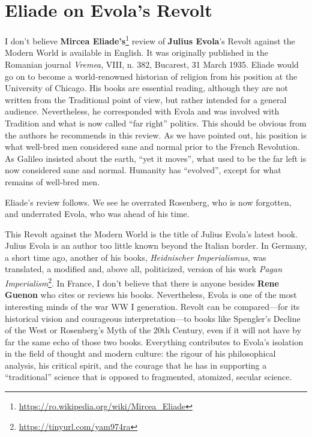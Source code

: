\section{Eliade on Evola’s Revolt}

\begin{quotex}
I don't believe \textbf{Mircea Eliade's}\footnote{\url{https://ro.wikipedia.org/wiki/Mircea\_Eliade}} review of \textbf{Julius Evola}'s Revolt against the Modern World is available in English. It was originally published in the Romanian journal \textit{Vremea}, VIII, n. 382, Bucarest, 31 March 1935. Eliade would go on to become a world-renowned historian of religion from his position at the University of Chicago. His books are essential reading, although they are not written from the Traditional point of view, but rather intended for a general audience. Nevertheless, he corresponded with Evola and was involved with Tradition and what is now called ``far right'' politics. This should be obvious from the authors he recommends in this review. As we have pointed out, his position is what well-bred men considered sane and normal prior to the French Revolution. As Galileo insisted about the earth, ``yet it moves'', what used to be the far left is now considered sane and normal. Humanity has ``evolved'', except for what remains of well-bred men.

Eliade's review follows. We see he overrated Rosenberg, who is now forgotten, and underrated Evola, who was ahead of his time.
\end{quotex}


This Revolt against the Modern World is the title of Julius Evola's latest book. Julius Evola is an author too little known beyond the Italian border. In Germany, a short time ago, another of his books,
\emph{Heidnischer Imperialismus}, was translated, a modified and, above all, politicized, version of his work \emph{Pagan Imperialism}\footnote{\url{https://tinyurl.com/yam974ra}}. In France, I don't believe that there is anyone besides \textbf{Rene Guenon} who cites or reviews his books. Nevertheless, Evola is one of the most interesting minds of the war WW I generation. Revolt can be compared---for its historical vision and courageous interpretation---to books like Spengler's Decline of the West or Rosenberg's Myth of the 20th Century, even if it will not have by far the same echo of those two books. Everything contributes to Evola's isolation in the field of thought and modern culture: the rigour of his philosophical analysis, his critical spirit, and the courage that he has in supporting a ``traditional'' science that is opposed to fragmented, atomized, secular science.

